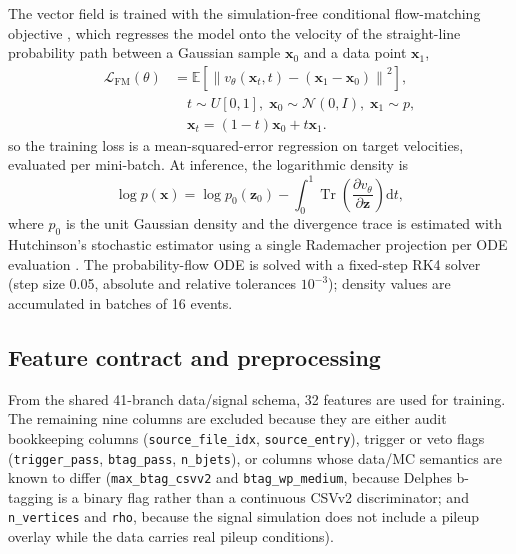 \documentclass[11pt,a4paper,twocolumn]{article}
\begin{document}
The vector field is trained with the simulation-free conditional
flow-matching objective \cite{lipman_flow_matching}, which regresses the
model onto the velocity of the straight-line probability path between a
Gaussian sample $\mathbf{x}_0$ and a data point $\mathbf{x}_1$,
\begin{equation}
  \begin{split}
  \mathcal{L}_{\mathrm{FM}}(\theta)
  &= \mathbb{E}\!\left[
  \left\lVert
  v_\theta(\mathbf{x}_t,t)-(\mathbf{x}_1-\mathbf{x}_0)
  \right\rVert^2
  \right],\\
  &\quad
  t\sim U[0,1],\;
  \mathbf{x}_0\sim\mathcal{N}(0,I),\;
  \mathbf{x}_1\sim p,\\
  &\quad
  \mathbf{x}_t=(1-t)\mathbf{x}_0+t\mathbf{x}_1.
  \end{split}
  \label{eq:fmloss}
\end{equation}
so the training loss is a mean-squared-error regression on target
velocities, evaluated per mini-batch. At inference, the logarithmic density
is
\begin{equation}
  \log p(\mathbf{x}) = \log p_0(\mathbf{z}_0) - \int_0^1 \operatorname{Tr}\!\left( \frac{\partial v_\theta}{\partial \mathbf{z}} \right) \mathrm{d}t,
  \label{eq:logprob}
\end{equation}
where $p_0$ is the unit Gaussian density and the divergence trace is
estimated with Hutchinson's stochastic estimator using a single Rademacher
projection per ODE evaluation \cite{grathwohl_ffjord}. The probability-flow
ODE is solved with a fixed-step RK4 solver (step size 0.05, absolute and
relative tolerances $10^{-3}$); density values are accumulated in batches of
16 events.

\subsection{Feature contract and preprocessing}

From the shared 41-branch data/signal schema, 32 features are used for
training. The remaining nine columns are excluded because they are either
audit bookkeeping columns (\texttt{source\_file\_idx}, \texttt{source\_entry}),
trigger or veto flags (\texttt{trigger\_pass}, \texttt{btag\_pass},
\texttt{n\_bjets}), or columns whose data/MC semantics are known to differ
(\texttt{max\_btag\_csvv2} and \texttt{btag\_wp\_medium}, because Delphes
b-tagging is a binary flag rather than a continuous CSVv2 discriminator; and
\texttt{n\_vertices} and \texttt{rho}, because the signal simulation does not
include a pileup overlay while the data carries real pileup conditions).
\end{document}

